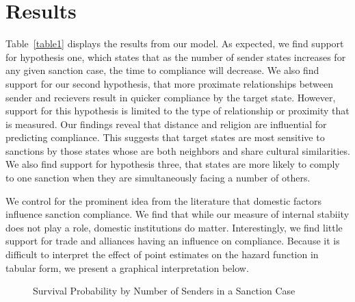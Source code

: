 \section*{Results}
\label{Results} 

Table~\ref{table1} displays the results from our model. As expected, we find support for hypothesis one, which states that as the number of sender states increases for any given sanction case, the time to compliance will decrease. We also find support for our second hypothesis, that more proximate relationships between sender and recievers result in quicker compliance by the target state. However, support for this hypothesis is limited to the type of relationship or proximity that is measured. Our findings reveal that distance and religion are influential for predicting compliance. This suggests that target states are most sensitive to sanctions by those states whose are both neighbors and share cultural similarities. We also find support for hypothesis three, that states are more likely to comply to one sanction when they are simultaneously facing a number of others. 

We control for the prominent idea from the literature that domestic factors influence sanction compliance. We find that while our measure of internal stabiity does not play a role, %
domestic institutions do matter. Interestingly, we find little support for trade and alliances having an influence on compliance. 
Because it is difficult to interpret the effect of point estimates on the hazard function in tabular form, we present a graphical interpretation below. 



\begin{figure}[ht]
	\centering
	\caption{Survival Probability by Number of Senders in a Sanction Case}
	\resizebox{1\textwidth}{!}{}
\end{figure}

\begin{figure}[ht]
	\centering
	\resizebox{1\textwidth}{!}{}	
\end{figure}

\begin{figure}[ht]
	\centering
	\resizebox{1\textwidth}{!}{}	
\end{figure}

